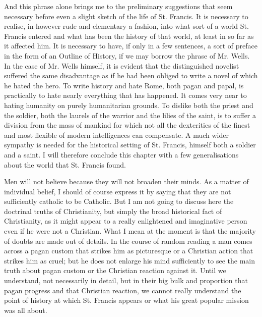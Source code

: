 \documentclass{book}
\begin{document}
And this phrase alone brings me to the preliminary suggestions that seem necessary before even a slight sketch of the life of St. Francis. It is necessary to realise, in however rude and elementary a fashion, into what sort of a world St. Francis entered and what has been the history of that world, at least in so far as it affected him. It is necessary to have, if only in a few sentences, a sort of preface in the form of an Outline of History, if we may borrow the phrase of Mr. Wells. In the case of Mr. Wells himself, it is evident that the distinguished novelist suffered the same disadvantage as if he had been obliged to write a novel of which he hated the hero. To write history and hate Rome, both pagan and papal, is practically to hate nearly everything that has happened. It comes very near to hating humanity on purely humanitarian grounds. To dislike both the priest and the soldier, both the laurels of the warrior and the lilies of the saint, is to suffer a division from the mass of mankind for which not all the dexterities of the finest and most flexible of modern intelligences can compensate. A much wider sympathy is needed for the historical setting of St. Francis, himself both a soldier and a saint. I will therefore conclude this chapter with a few generalisations about the world that St. Francis found.

Men will not believe because they will not broaden their minds. As a matter of individual belief, I should of course express it by saying that they are not sufficiently catholic to be Catholic. But I am not going to discuss here the doctrinal truths of Christianity, but simply the broad historical fact of Christianity, as it might appear to a really enlightened and imaginative person even if he were not a Christian. What I mean at the moment is that the majority of doubts are made out of details. In the course of random reading a man comes across a pagan custom that strikes him as picturesque or a Christian action that strikes him as cruel; but he does not enlarge his mind sufficiently to see the main truth about pagan custom or the Christian reaction against it. Until we understand, not necessarily in detail, but in their big bulk and proportion that pagan progress and that Christian reaction, we cannot really understand the point of history at which St. Francis appears or what his great popular mission was all about.
\end{document}
